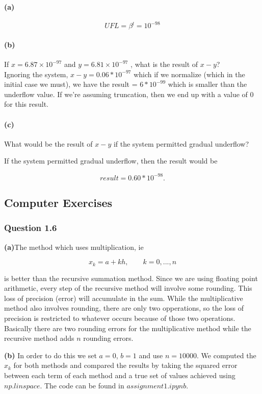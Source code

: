 \documentclass{article}
\begin{document}
\paragraph{(a)}
$$UFL = \beta{}^{l} = 10 ^{-98}$$

\paragraph{(b)} If $x = 6.87 × 10^{-97}$ and $y = 6.81 × 10^{-97}$ ,
what is the result of $x - y$?\\

Ignoring the system, $x - y = 0.06 * 10 ^{-97}$ which if we normalize 
(which in 
the initial case we must), we have the result = $6*10^{-99}$ which is 
smaller than 
the underflow value. If we're assuming truncation, then we end up with 
a value of 
0 for this result.



\paragraph{(c)}What would be the result of $x - y$ if the
system permitted gradual underflow?

If the system permitted gradual underflow, then the result would be

$$result= 0.60 * 10^{-98}.$$


\subsection{Computer Exercises}
\subsubsection{Question 1.6}

\textbf{(a)}The method which uses multiplication, ie

$$x_k = a + kh, \qquad k=0,...,n$$

is better than the recursive summation method. Since we are using 
floating
point arithmetic, every step of the recursive method will involve some 
rounding. 
This loss of precision (error) will accumulate in the sum. While the 
multiplicative method also involves rounding, there are only two 
opperations, so 
the loss of precision is restricted to whatever occurs because of those 
two 
operations. Basically there are two rounding errors for the 
multiplicative method 
while the recursive method adds $n$ rounding errors.

\textbf{(b)}
In order to do this we set $a=0$, $b=1$ and use $n=10000$. We computed 
the $x_k$ 
for both methods and compared the results by taking the squared error 
between each 
term of each method and a true set of values achieved using 
$np.linspace$. The 
code can be found in $assignment1.ipynb.$\\
\end{document}

